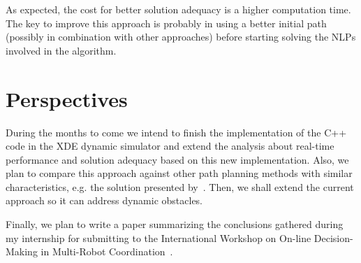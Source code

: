 As expected, the cost for better solution adequacy is a higher computation time. The key to improve this approach is probably in using a better initial path (possibly in combination with other approaches) before starting solving the NLPs involved in the algorithm.

\section{Perspectives}

During the months to come we intend to finish the implementation of the C++ code in the XDE dynamic simulator and extend the analysis about real-time performance and solution adequacy based on this new implementation. Also, we plan to compare this approach against other path planning methods with similar characteristics, e.g. the solution presented by~\cite{Kelly2003}. Then, we shall extend the current approach so it can address dynamic obstacles.

Finally, we plan to write a paper summarizing the conclusions gathered during my internship for submitting to the International Workshop on On-line Decision-Making in Multi-Robot Coordination~\cite{Workshop}.







